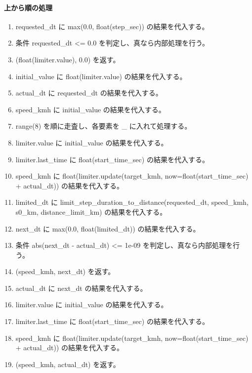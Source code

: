 \documentclass[a4paper,11pt]{article}
\begin{document}
            \paragraph{上から順の処理}
            \begin{enumerate}[leftmargin=1.8em]
            \item requested\_dt に max(0.0, float(step\_sec)) の結果を代入する。
\item 条件 requested\_dt <= 0.0 を判定し、真なら内部処理を行う。
\item   (float(limiter.value), 0.0) を返す。
\item initial\_value に float(limiter.value) の結果を代入する。
\item actual\_dt に requested\_dt の結果を代入する。
\item speed\_kmh に initial\_value の結果を代入する。
\item range(8) を順に走査し、各要素を \_ に入れて処理する。
\item   limiter.value に initial\_value の結果を代入する。
\item   limiter.last\_time に float(start\_time\_sec) の結果を代入する。
\item   speed\_kmh に float(limiter.update(target\_kmh, now=float(start\_time\_sec) + actual\_dt)) の結果を代入する。
\item   limited\_dt に limit\_step\_duration\_to\_distance(requested\_dt, speed\_kmh, s0\_km, distance\_limit\_km) の結果を代入する。
\item   next\_dt に max(0.0, float(limited\_dt)) の結果を代入する。
\item   条件 abs(next\_dt - actual\_dt) <= 1e-09 を判定し、真なら内部処理を行う。
\item     (speed\_kmh, next\_dt) を返す。
\item   actual\_dt に next\_dt の結果を代入する。
\item limiter.value に initial\_value の結果を代入する。
\item limiter.last\_time に float(start\_time\_sec) の結果を代入する。
\item speed\_kmh に float(limiter.update(target\_kmh, now=float(start\_time\_sec) + actual\_dt)) の結果を代入する。
\item (speed\_kmh, actual\_dt) を返す。
            \end{enumerate}
\end{document}
